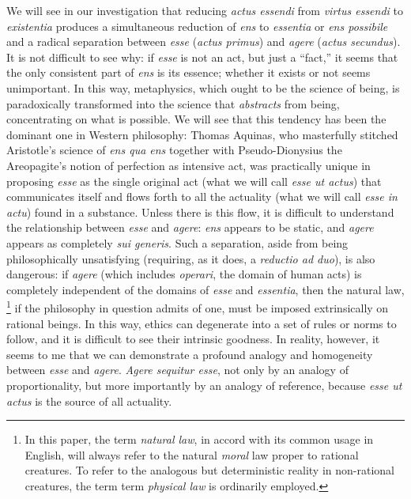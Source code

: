 We will see in our investigation that reducing \emph{actus essendi} from \emph{virtus essendi} to \emph{existentia} produces a simultaneous reduction of \emph{ens} to \emph{essentia} or \emph{ens possibile} and a radical separation between \emph{esse} (\emph{actus primus}) and \emph{agere} (\emph{actus secundus}). It is not difficult to see why: if \emph{esse} is not an act, but just a “fact,” it seems that the only consistent part of \emph{ens} is its essence; whether it exists or not seems unimportant. In this way, metaphysics, which ought to be the science of being, is paradoxically transformed into the science that \emph{abstracts} from being, concentrating on what is possible. We will see that this tendency has been the dominant one in Western philosophy: Thomas Aquinas, who masterfully stitched Aristotle’s science of \emph{ens qua ens} together with Pseudo-Dionysius the Areopagite’s notion of perfection as intensive act, was practically unique in proposing \emph{esse} as the single original act (what we will call \emph{esse ut actus}) that communicates itself and flows forth to all the actuality (what we will call \emph{esse in actu}) found in a substance. Unless there is this flow, it is difficult to understand the relationship between \emph{esse} and \emph{agere}: \emph{ens} appears to be static, and \emph{agere} appears as completely \emph{sui generis}. Such a separation, aside from being philosophically unsatisfying (requiring, as it does, a \emph{reductio ad duo}), is also dangerous: if \emph{agere} (which includes \emph{operari}, the domain of human acts) is completely independent of the domains of \emph{esse} and \emph{essentia}, then the natural law,%
%
\footnote{In this paper, the term \emph{natural law}, in accord with its common usage in English, will always refer to the natural \emph{moral} law proper to rational creatures. To refer to the analogous but deterministic reality in non-rational creatures, the term term \emph{physical law} is ordinarily employed.}
%
if the philosophy in question admits of one, must be imposed extrinsically on rational beings. In this way, ethics can degenerate into a set of rules or norms to follow, and it is difficult to see their intrinsic goodness. In reality, however, it seems to me that we can demonstrate a profound analogy and homogeneity between \emph{esse} and \emph{agere}. \emph{Agere sequitur esse}, not only by an analogy of proportionality, but more importantly by an analogy of reference, because \emph{esse ut actus} is the source of all actuality.


